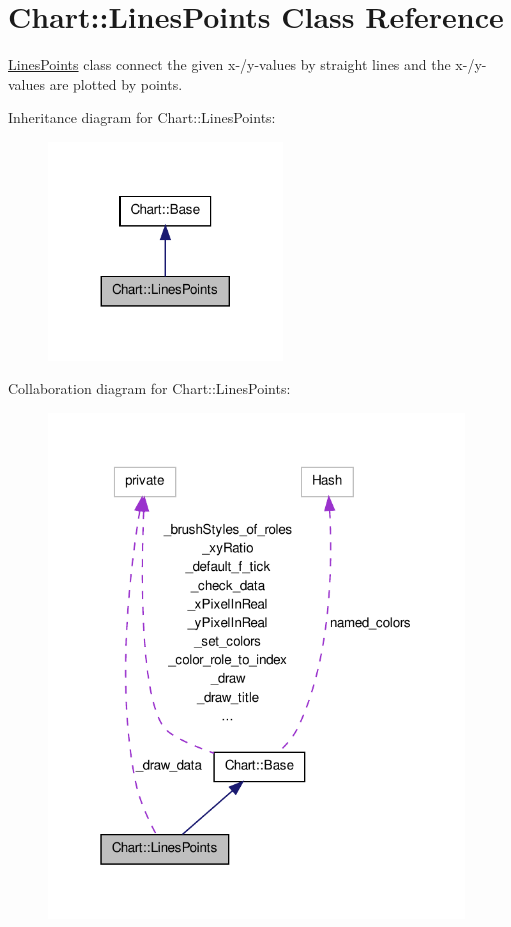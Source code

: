 \hypertarget{classChart_1_1LinesPoints}{
\section{Chart::LinesPoints Class Reference}
\label{classChart_1_1LinesPoints}
}


\hyperlink{classChart_1_1LinesPoints}{LinesPoints} class connect the given x-\//y-\/values by straight lines and the x-\//y-\/values are plotted by points.  




Inheritance diagram for Chart::LinesPoints:\nopagebreak
\begin{figure}[H]
\begin{center}
\leavevmode
\includegraphics[width=176pt]{classChart_1_1LinesPoints__inherit__graph}
\end{center}
\end{figure}


Collaboration diagram for Chart::LinesPoints:\nopagebreak
\begin{figure}[H]
\begin{center}
\leavevmode
\includegraphics[width=313pt]{classChart_1_1LinesPoints__coll__graph}
\end{center}
\end{figure}
